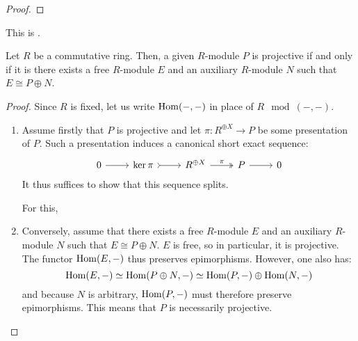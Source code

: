             \begin{lemma} \label{lemma: epimorphisms_into_projectives_split}
            
            \end{lemma}
                \begin{proof}
                    
                \end{proof}
            \begin{proposition} \label{prop: projective_modules_are_direct_summands_of_free_modules}
                This is \cite[Proposition VIII.6.4]{chapter0}.
                    
                Let $R$ be a commutative ring. Then, a given $R$-module $P$ is projective if and only if it is there exists a free $R$-module $E$ and an auxiliary $R$-module $N$ such that $E \cong P \oplus N$.
            \end{proposition}
                \begin{proof}
                    Since $R$ is fixed, let us write $\mathrm{Hom}(-, -)$ in place of $R\mod(-, -)$. 
                    \begin{enumerate}
                        \item Assume firstly that $P$ is projective and let $\pi: R^{\oplus X} \to P$ be some presentation of $P$. Such a presentation induces a canonical short exact sequence:
                            $$
                                \begin{tikzcd}
                                	0 & {\ker \pi} & {R^{\oplus X}} & P & 0
                                	\arrow[from=1-1, to=1-2]
                                	\arrow[tail, from=1-2, to=1-3]
                                	\arrow["\pi", two heads, from=1-3, to=1-4]
                                	\arrow[from=1-4, to=1-5]
                                \end{tikzcd}
                            $$
                        It thus suffices to show that this sequence splits. 
                        
                        For this, 
                        \item Conversely, assume that there exists a free $R$-module $E$ and an auxiliary $R$-module $N$ such that $E \cong P \oplus N$. $E$ is free, so in particular, it is projective. The functor $\mathrm{Hom}(E, -)$ thus preserves epimorphisms. However, one also has:
                            $$\mathrm{Hom}(E, -) \simeq \mathrm{Hom}(P \oplus N, -) \simeq \mathrm{Hom}(P, -) \oplus \mathrm{Hom}(N, -)$$
                        and because $N$ is arbitrary, $\mathrm{Hom}(P, -)$ must therefore preserve epimorphisms. This means that $P$ is necessarily projective. 
                    \end{enumerate}
                \end{proof}
